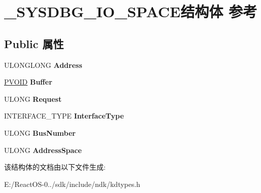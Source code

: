 \hypertarget{struct___s_y_s_d_b_g___i_o___s_p_a_c_e}{}\section{\+\_\+\+S\+Y\+S\+D\+B\+G\+\_\+\+I\+O\+\_\+\+S\+P\+A\+C\+E结构体 参考}
\label{struct___s_y_s_d_b_g___i_o___s_p_a_c_e}
\subsection*{Public 属性}
\begin{DoxyCompactItemize}
\item 
\mbox{\label{struct___s_y_s_d_b_g___i_o___s_p_a_c_e_ab7b74dc681bba06664c77843fa36a695}} 
U\+L\+O\+N\+G\+L\+O\+NG {\bfseries Address}
\item 
\mbox{\label{struct___s_y_s_d_b_g___i_o___s_p_a_c_e_ac0caa6312344e8ffb98f9053a1670eef}} 
\hyperlink{interfacevoid}{P\+V\+O\+ID} {\bfseries Buffer}
\item 
\mbox{\label{struct___s_y_s_d_b_g___i_o___s_p_a_c_e_ac2711e03d22b123daef97f358109508c}} 
U\+L\+O\+NG {\bfseries Request}
\item 
\mbox{\label{struct___s_y_s_d_b_g___i_o___s_p_a_c_e_a478efe15af7f2bb0c648736f7525ea79}} 
I\+N\+T\+E\+R\+F\+A\+C\+E\+\_\+\+T\+Y\+PE {\bfseries Interface\+Type}
\item 
\mbox{\label{struct___s_y_s_d_b_g___i_o___s_p_a_c_e_a56b7360d2660b357209fa938c13e61b5}} 
U\+L\+O\+NG {\bfseries Bus\+Number}
\item 
\mbox{\label{struct___s_y_s_d_b_g___i_o___s_p_a_c_e_ab3fbd16c8c7f7e724a2b238dfa6f81d5}} 
U\+L\+O\+NG {\bfseries Address\+Space}
\end{DoxyCompactItemize}


该结构体的文档由以下文件生成\+:\begin{DoxyCompactItemize}
\item 
E\+:/\+React\+O\+S-\/0../sdk/include/ndk/kdtypes.\+h\end{DoxyCompactItemize}
